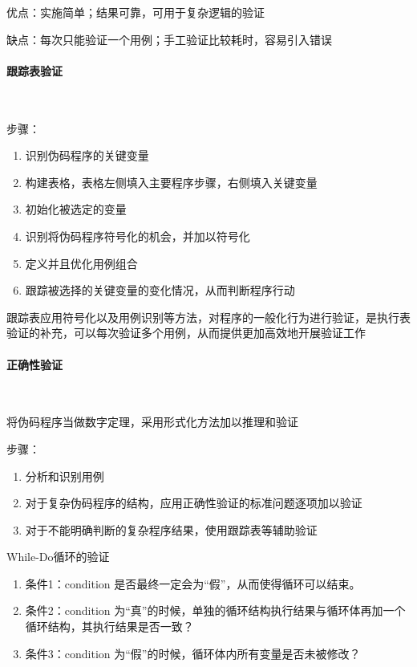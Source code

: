 优点：实施简单；结果可靠，可用于复杂逻辑的验证

缺点：每次只能验证一个用例；手工验证比较耗时，容易引入错误

\paragraph{跟踪表验证}~{} \par
步骤：
\vspace{-0.8em}
\begin{multicols}{2}
    \begin{enumerate}[label=\arabic*.]
        \item 识别伪码程序的关键变量
        \item 构建表格，表格左侧填入主要程序步骤，右侧填入关键变量
        \item 初始化被选定的变量
        \item 识别将伪码程序符号化的机会，并加以符号化
        \item 定义并且优化用例组合
        \item 跟踪被选择的关键变量的变化情况，从而判断程序行动
    \end{enumerate}
\end{multicols}
\vspace{-1em}

跟踪表应用符号化以及用例识别等方法，对程序的一般化行为进行验证，是执行表验证的补充，可以每次验证多个用例，从而提供更加高效地开展验证工作

\paragraph{正确性验证}~{} \par
将伪码程序当做数字定理，采用形式化方法加以推理和验证

步骤：
\vspace{-0.8em}
\begin{multicols}{2}
    \begin{enumerate}[label=\arabic*.]
        \item 分析和识别用例
        \item 对于复杂伪码程序的结构，应用正确性验证的标准问题逐项加以验证
        \item 对于不能明确判断的复杂程序结果，使用跟踪表等辅助验证
    \end{enumerate}
\end{multicols}
\vspace{-1em}

While-Do循环的验证
\begin{enumerate}[label=\arabic*.]
    \item 条件1：condition 是否最终一定会为“假”，从而使得循环可以结束。
    \item 条件2：condition 为“真”的时候，单独的循环结构执行结果与循环体再加一个循环结构，其执行结果是否一致？
    \item 条件3：condition 为“假”的时候，循环体内所有变量是否未被修改？
\end{enumerate}
